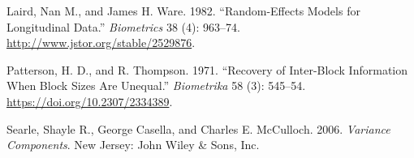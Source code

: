 \documentclass[
]{article}
\newlength{\cslhangindent}
\newlength{\cslentryspacingunit} %
\newenvironment{CSLReferences}[2] %
 {%
  \setlength{\parindent}{0pt}
  \ifodd #1
  \let\oldpar\par
  \def\par{\hangindent=\cslhangindent\oldpar}
  \fi
  \setlength{\parskip}{#2\cslentryspacingunit}
 }%
 {}
\begin{document}
\begin{CSLReferences}{1}{0}
\leavevmode{}%
Laird, Nan M., and James H. Ware. 1982. {``Random-Effects Models for
Longitudinal Data.''} \emph{Biometrics} 38 (4): 963--74.
\url{http://www.jstor.org/stable/2529876}.

\leavevmode{}%
Patterson, H. D., and R. Thompson. 1971. {``Recovery of Inter-Block
Information When Block Sizes Are Unequal.''} \emph{Biometrika} 58 (3):
545--54. \url{https://doi.org/10.2307/2334389}.

\leavevmode{}%
Searle, Shayle R., George Casella, and Charles E. McCulloch. 2006.
\emph{Variance Components}. New Jersey: John Wiley \& Sons, Inc.

\end{CSLReferences}
\end{document}

